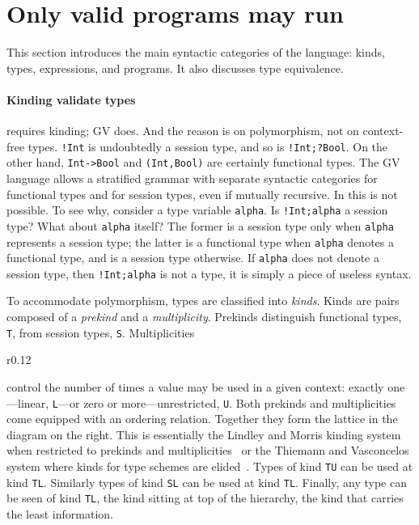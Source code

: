 \section{Only valid programs may run}
\label{sec:valid}

This section introduces the main syntactic categories of the language:
kinds, types, expressions, and programs. It also discusses type
equivalence.

\paragraph{Kinding validate types}

\freest{} requires kinding; GV does. And the reason is on
polymorphism, not on context-free types.
%
\lstinline|!Int| is undoubtedly a session type, and so is
\lstinline|!Int;?Bool|. On the other hand, \lstinline|Int->Bool| and
\lstinline|(Int,Bool)| are certainly functional types. The GV language
allows a stratified grammar with separate syntactic categories for
functional types and for session types, even if mutually recursive.
%
In \freest{} this is not possible.  To see why, consider a type
variable \lstinline|alpha|. Is \lstinline|!Int;alpha| a session type?
What about \lstinline|alpha| itself? The former is a session type only
when \lstinline|alpha| represents a session type; the latter is a
functional type when \lstinline|alpha| denotes a functional type, and
is a session type otherwise. If \lstinline|alpha| does not denote a
session type, then \lstinline|!Int;alpha| is not a type, it is simply
a piece of useless syntax.

To accommodate polymorphism, types are classified into \emph{kinds}.
%
Kinds are pairs composed of a \emph{prekind} and a
\emph{multiplicity}. Prekinds distinguish functional types,
\lstinline|T|, from session types, \lstinline|S|. Multiplicities
%
\begin{wrapfigure}{r}{0.12\textwidth}
\end{wrapfigure}
%
control the number of times a value may be used in a
given context: exactly one---linear, \lstinline|L|---or zero or
more---unrestricted, \lstinline|U|. Both prekinds and multiplicities
come equipped with an ordering relation. Together they form the
lattice in the diagram on the right.
%
This is essentially the Lindley and Morris kinding system when
restricted to prekinds and
multiplicities~\cite{Lindley.Morris_Lightweight.functional.session.types}
or the Thiemann and Vasconcelos system where kinds for type schemes
are elided~\cite{DBLP:conf/icfp/ThiemannV16}.
%
Types of kind \lstinline|TU| can be used at kind
\lstinline|TL|. Similarly
types of kind \lstinline|SL| can be used at
kind \lstinline|TL|.  Finally, any type can be seen of kind
\lstinline|TL|, the kind sitting at top of the hierarchy, the kind
that carries the least information.

